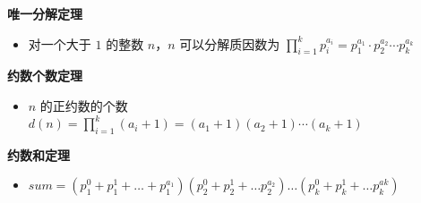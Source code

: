 \documentclass[E:/GsjzTle/main/main.tex]{subfiles}
\begin{document}
\textbf{唯一分解定理}

\begin{itemize}
\item
  对一个大于 \(1\) 的整数 \(n\)，\(n\) 可以分解质因数为 \(
  \prod_{i=1}^{k} p_{i}^{a_{i}}=p_{1}^{a_{1}} \cdot p_{2}^{a_{2}} \cdots p_{k}^{a_{k}}
  \)
\end{itemize}

\textbf{约数个数定理}

\begin{itemize}
\item
  \(n\) 的正约数的个数 \(
  d(n)=\prod_{i=1}^{k} (a_{i}+1)=\left(a_{1}+1\right)\left(a_{2}+1\right) \cdots\left(a_{k}+1\right)
  \)
\end{itemize}

\textbf{约数和定理}

\begin{itemize}
\item
  \(sum = 
  \left(p_{1}^{0}+p_{1}^{1}+\ldots+p_{1}^{a_{1}}\right)\left(p_{2}^{0}+p_{2}^{1}+\ldots p_{2}^{a_{2}}\right) \ldots\left(p_{k}^{0}+p_{k}^{1}+\ldots p_{k}^{a k}\right)
  \)
\end{itemize}
\end{document}
